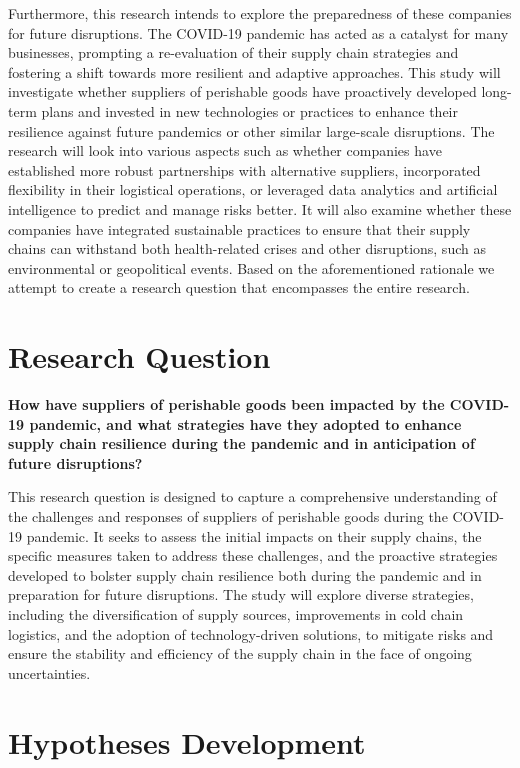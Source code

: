 Furthermore, this research intends to explore the preparedness of these companies for future disruptions. The COVID-19 pandemic has acted as a catalyst for many businesses, prompting a re-evaluation of their supply chain strategies and fostering a shift towards more resilient and adaptive approaches. This study will investigate whether suppliers of perishable goods have proactively developed long-term plans and invested in new technologies or practices to enhance their resilience against future pandemics or other similar large-scale disruptions. The research will look into various aspects such as whether companies have established more robust partnerships with alternative suppliers, incorporated flexibility in their logistical operations, or leveraged data analytics and artificial intelligence to predict and manage risks better. It will also examine whether these companies have integrated sustainable practices to ensure that their supply chains can withstand both health-related crises and other disruptions, such as environmental or geopolitical events. Based on the aforementioned rationale we attempt to create a research question that encompasses the entire research.


\section{Research Question}

\textbf{How have suppliers of perishable goods been impacted by the COVID-19 pandemic, and what strategies have they adopted to enhance supply chain resilience during the pandemic and in anticipation of future disruptions?}

\noindent This research question is designed to capture a comprehensive understanding of the challenges and responses of suppliers of perishable goods during the COVID-19 pandemic. It seeks to assess the initial impacts on their supply chains, the specific measures taken to address these challenges, and the proactive strategies developed to bolster supply chain resilience both during the pandemic and in preparation for future disruptions. The study will explore diverse strategies, including the diversification of supply sources, improvements in cold chain logistics, and the adoption of technology-driven solutions, to mitigate risks and ensure the stability and efficiency of the supply chain in the face of ongoing uncertainties.


\section{Hypotheses Development}

